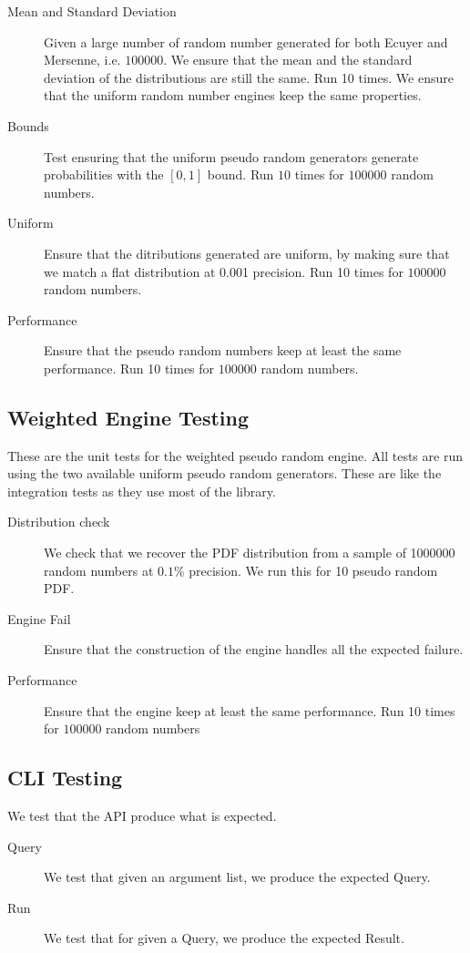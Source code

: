 \documentclass[12pt,a4paper,article]{memoir} %
\begin{document}
\begin{description}
	\item [Mean and Standard Deviation]
		Given a large number of random number generated for
		both Ecuyer and Mersenne, i.e. $100000$.
		We ensure that the mean and the standard deviation 
		of the distributions are still the same. Run 10 times.
		We ensure that the uniform random number engines keep
		the same properties.
	\item [Bounds]
		Test ensuring that the uniform pseudo random generators
		generate probabilities with the $[0, 1]$ bound.
		Run $10$ times for $100000$ random numbers.
	\item [Uniform]
		Ensure that the ditributions generated are uniform,
		by making sure that we match a flat distribution at 0.001
		precision.
		Run 10 times for $100000$ random numbers.
	\item [Performance]
		Ensure that the pseudo random numbers keep at
		least the same performance.
		Run 10 times for $100000$ random numbers.
\end{description}

\subsection{Weighted Engine Testing} 
These are the unit tests for the weighted pseudo random engine.
All tests are run using the two available uniform pseudo random
generators. 
These are like the integration tests as they use most of the library.
\begin{description}
	\item [Distribution check]
		We check that we recover the PDF distribution from
		a sample of 1000000 random numbers at $0.1\%$ precision.
		We run this for 10 pseudo random PDF.
	\item [Engine Fail]
		Ensure that the construction of the engine 
		handles all the expected failure.
	\item [Performance]
		Ensure that the engine keep at least the same performance.
		Run 10 times for $100000$ random  numbers	
\end{description}	

\subsection{CLI Testing}
We test that the API produce what is expected.
\begin{description}
	\item [Query]
	We test that given an argument list, we produce the expected
	Query.
	\item[Run]
	We test that for given a Query, we produce the expected Result.
\end{description}
\end{document}
